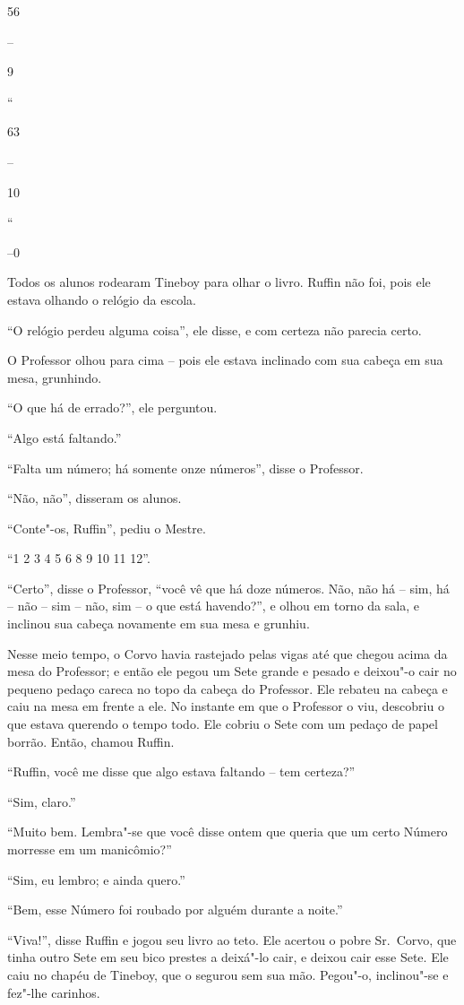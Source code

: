 56

--

9

``

63

--

10

``

--0

Todos os alunos rodearam Tineboy para olhar o livro. Ruffin não foi,
pois ele estava olhando o relógio da escola.

``O relógio perdeu alguma coisa'', ele disse, e com certeza não parecia
certo.

O Professor olhou para cima -- pois ele estava inclinado com sua cabeça
em sua mesa, grunhindo.

``O que há de errado?'', ele perguntou.

``Algo está faltando.''

``Falta um número; há somente onze números'', disse o Professor.

``Não, não'', disseram os alunos.

``Conte"-os, Ruffin'', pediu o Mestre.

``1 2 3 4 5 6 8 9 10 11 12''.

``Certo'', disse o Professor, ``você vê que há doze números. Não, não há
-- sim, há -- não -- sim -- não, sim -- o que está havendo?'', e olhou
em torno da sala, e inclinou sua cabeça novamente em sua mesa e grunhiu.

Nesse meio tempo, o Corvo havia rastejado pelas vigas até que chegou
acima da mesa do Professor; e então ele pegou um Sete grande e pesado e
deixou"-o cair no pequeno pedaço careca no topo da cabeça do Professor.
Ele rebateu na cabeça e caiu na mesa em frente a ele. No instante em que
o Professor o viu, descobriu o que estava querendo o tempo todo. Ele
cobriu o Sete com um pedaço de papel borrão. Então, chamou Ruffin.

``Ruffin, você me disse que algo estava faltando -- tem certeza?''

``Sim, claro.''

``Muito bem. Lembra"-se que você disse ontem que queria que um certo
Número morresse em um manicômio?''

``Sim, eu lembro; e ainda quero.''

``Bem, esse Número foi roubado por alguém durante a noite.''

``Viva!'', disse Ruffin e jogou seu livro ao teto. Ele acertou o pobre
Sr.~Corvo, que tinha outro Sete em seu bico prestes a deixá"-lo cair, e
deixou cair esse Sete. Ele caiu no chapéu de Tineboy, que o segurou sem
sua mão. Pegou"-o, inclinou"-se e fez"-lhe carinhos.

